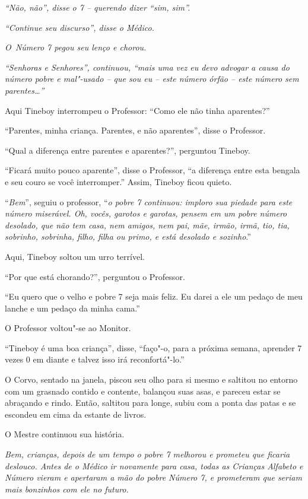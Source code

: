 \emph{``Não, não'', disse o 7 -- querendo dizer ``sim, sim''.}

\emph{``Continue seu discurso'', disse o Médico.}

\emph{O~Número 7 pegou seu lenço e chorou.}

\emph{``Senhoras e Senhores'', continuou, ``mais uma vez eu devo
advogar a causa do número pobre e mal"-usado -- que sou eu -- este número
órfão -- este número sem parentes\ldots{}''}

Aqui Tineboy interrompeu o Professor: ``Como ele não tinha aparentes?''

``Parentes, minha criança. Parentes, e não aparentes'', disse o
Professor.

``Qual a diferença entre parentes e aparentes?'', perguntou Tineboy.

``Ficará muito pouco aparente'', disse o Professor, ``a diferença entre
esta bengala e seu couro se você interromper.'' Assim, Tineboy ficou
quieto.

``\emph{Bem}'', seguiu o professor, ``\emph{o pobre 7 continuou: imploro
sua piedade para este número miserável. Oh, vocês, garotos e garotas,
pensem em um pobre número desolado, que não tem casa, nem amigos, nem
pai, mãe, irmão, irmã, tio, tia, sobrinho, sobrinha, filho, filha ou
primo, e está desolado e sozinho}.''

Aqui, Tineboy soltou um urro terrível.

``Por que está chorando?'', perguntou o Professor.

``Eu quero que o velho e pobre 7 seja mais feliz. Eu darei a ele um
pedaço de meu lanche e um pedaço da minha cama.''

O Professor voltou"-se ao Monitor.

``Tineboy é uma boa criança'', disse, ``faço"-o, para a próxima
semana, aprender 7 vezes 0 em diante e talvez isso irá reconfortá"-lo.''

O Corvo, sentado na janela, piscou seu olho para si mesmo e saltitou no
entorno com um grasnado contido e contente, balançou suas asas, e
pareceu estar se abraçando e rindo. Então, saltitou para longe, subiu
com a ponta das patas e se escondeu em cima da estante de livros.

O Mestre continuou sua história.

\emph{Bem, crianças, depois de um tempo o pobre 7 melhorou e prometeu
que ficaria deslouco. Antes de o Médico ir novamente para casa,
todas as Crianças Alfabeto e Número vieram e apertaram a mão do pobre
Número 7, e prometeram que seriam mais bonzinhos com ele no
futuro.}

